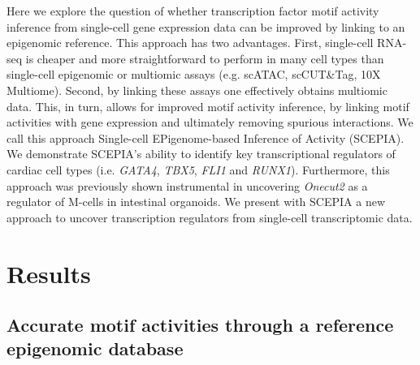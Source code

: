 Here we explore the question of whether transcription factor motif activity inference from single-cell gene expression data can be improved by linking to an epigenomic reference. This approach has two advantages. First, single-cell RNA-seq is cheaper and more straightforward to perform in many cell types than single-cell epigenomic or multiomic assays (e.g. scATAC, scCUT\&Tag, 10X Multiome). Second, by linking these assays one effectively obtains multiomic data. This, in turn, allows for improved motif activity inference, by linking motif activities with gene expression and ultimately removing spurious interactions. We call this approach Single-cell EPigenome-based Inference of Activity (SCEPIA). We demonstrate SCEPIA's ability to identify key transcriptional regulators of cardiac cell types (i.e. \textit{GATA4}, \textit{TBX5}, \textit{FLI1} and \textit{RUNX1}). Furthermore, this approach was previously shown instrumental in uncovering \textit{Onecut2} as a regulator of M-cells in intestinal organoids\cite{LunaVelez2023}. We present with SCEPIA a new approach to uncover transcription regulators from single-cell transcriptomic data. 

\section{Results}

\subsection{Accurate motif activities through a reference epigenomic database}

